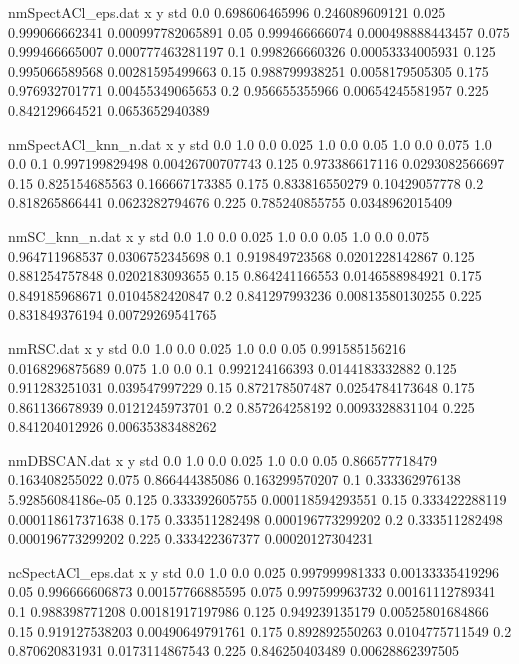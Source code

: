 
\begin{filecontents}{nmSpectACl_eps.dat}
x y std
0.0 0.698606465996 0.246089609121
0.025 0.999066662341 0.000997782065891
0.05 0.999466666074 0.000498888443457
0.075 0.999466665007 0.000777463281197
0.1 0.998266660326 0.00053334005931
0.125 0.995066589568 0.00281595499663
0.15 0.988799938251 0.0058179505305
0.175 0.976932701771 0.00455349065653
0.2 0.956655355966 0.00654245581957
0.225 0.842129664521 0.0653652940389
\end{filecontents}
\begin{filecontents}{nmSpectACl_knn_n.dat}
x y std
0.0 1.0 0.0
0.025 1.0 0.0
0.05 1.0 0.0
0.075 1.0 0.0
0.1 0.997199829498 0.00426700707743
0.125 0.973386617116 0.0293082566697
0.15 0.825154685563 0.166667173385
0.175 0.833816550279 0.10429057778
0.2 0.818265866441 0.0623282794676
0.225 0.785240855755 0.0348962015409
\end{filecontents}
\begin{filecontents}{nmSC_knn_n.dat}
x y std
0.0 1.0 0.0
0.025 1.0 0.0
0.05 1.0 0.0
0.075 0.964711968537 0.0306752345698
0.1 0.919849723568 0.0201228142867
0.125 0.881254757848 0.0202183093655
0.15 0.864241166553 0.0146588984921
0.175 0.849185968671 0.0104582420847
0.2 0.841297993236 0.00813580130255
0.225 0.831849376194 0.00729269541765
\end{filecontents}
\begin{filecontents}{nmRSC.dat}
x y std
0.0 1.0 0.0
0.025 1.0 0.0
0.05 0.991585156216 0.0168296875689
0.075 1.0 0.0
0.1 0.992124166393 0.0144183332882
0.125 0.911283251031 0.039547997229
0.15 0.872178507487 0.0254784173648
0.175 0.861136678939 0.0121245973701
0.2 0.857264258192 0.0093328831104
0.225 0.841204012926 0.00635383488262
\end{filecontents}
\begin{filecontents}{nmDBSCAN.dat}
x y std
0.0 1.0 0.0
0.025 1.0 0.0
0.05 0.866577718479 0.163408255022
0.075 0.866444385086 0.163299570207
0.1 0.333362976138 5.92856084186e-05
0.125 0.333392605755 0.000118594293551
0.15 0.333422288119 0.000118617371638
0.175 0.333511282498 0.000196773299202
0.2 0.333511282498 0.000196773299202
0.225 0.333422367377 0.00020127304231
\end{filecontents}
\begin{filecontents}{ncSpectACl_eps.dat}
x y std
0.0 1.0 0.0
0.025 0.997999981333 0.00133335419296
0.05 0.996666606873 0.00157766885595
0.075 0.997599963732 0.00161112789341
0.1 0.988398771208 0.00181917197986
0.125 0.949239135179 0.00525801684866
0.15 0.919127538203 0.00490649791761
0.175 0.892892550263 0.0104775711549
0.2 0.870620831931 0.0173114867543
0.225 0.846250403489 0.00628862397505
\end{filecontents}
